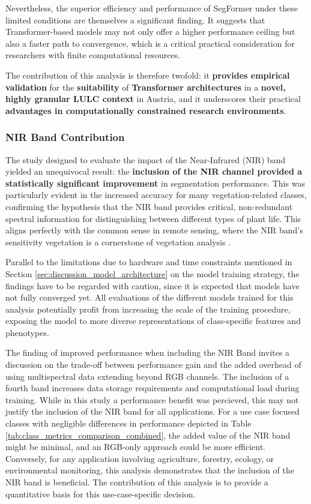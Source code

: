 \documentclass{report}
\begin{document}
\par 
Nevertheless, the superior efficiency and performance of SegFormer under these limited conditions are themselves a significant finding. It suggests that Transformer-based models may not only offer a higher performance ceiling but also a faster path to convergence, which is a critical practical consideration for researchers with finite computational resources. 
\par The contribution of this analysis is therefore twofold: it \textbf{provides empirical validation} for the \textbf{suitability} of \textbf{Transformer architectures} in a \textbf{novel, highly granular LULC context} in Austria, and it underscores their practical \textbf{advantages in computationally constrained research environments}.
\subsubsection{NIR Band Contribution}
The study designed to evaluate the impact of the Near-Infrared (NIR) band yielded an unequivocal result: the \textbf{inclusion of the NIR channel provided a statistically significant improvement} in segmentation performance. This was particularly evident in the increased accuracy for many vegetation-related classes, confirming the hypothesis that the NIR band provides critical, non-redundant spectral information for distinguishing between different types of plant life. This aligns perfectly with the common sense in remote sensing, where the NIR band's sensitivity vegetation is a cornerstone of vegetation analysis \parencite[p.~183]{LuoEtAlSemanticsegmentationagriculturalimagessurvey2024}. \par
Parallel to the limitations due to hardware and time constraints mentioned in Section \ref{sec:discussion_model_architecture} on the model training strategy, the findings have to be regarded with caution, since it is expected that models have not fully converged yet. All evaluations of the different models trained for this analysis potentially profit from increasing the scale of the training procedure, exposing the model to more diverse representations of class-specific features and phenotypes. \par
The finding of improved performance when including the NIR Band invites a discussion on the trade-off between performance gain and the added overhead of using multispectral data extending beyond RGB channels. The inclusion of a fourth band increases data storage requirements and computational load during training. While in this study a performance benefit was percieved, this may not justify the inclusion of the NIR band for all applications. For a use case focused classes with negligible differences in performance depicted in Table \ref{tab:class_metrics_comparison_combined}, the added value of the NIR band might be minimal, and an RGB-only approach could be more efficient. Conversely, for any application involving agriculture, forestry, ecology, or environmental monitoring, this analysis demonstrates that the inclusion of the NIR band is beneficial. The contribution of this analysis is to provide a quantitative basis for this use-case-specific decision.
\end{document}
